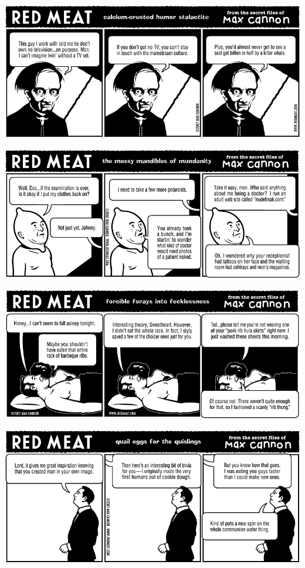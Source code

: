 \documentclass[a4paper,twoside,11pt]{article}
\begin{document}
\includegraphics[width=\textwidth]{redmeat_2007-07-03.png}



\includegraphics[width=\textwidth]{redmeat_2007-07-10.png}



\includegraphics[width=\textwidth]{redmeat_2007-07-17.png}



\includegraphics[width=\textwidth]{redmeat_2007-07-24.png}
\end{document}

